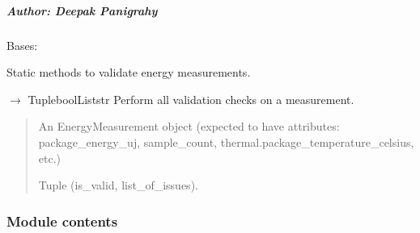 \documentclass[letterpaper,10pt,english]{sphinxmanual}
\begin{document}
\subparagraph{Author: Deepak Panigrahy}
\label{\detokenize{core.utils.validators:author-deepak-panigrahy}}

\begin{fulllineitems}
\label{\detokenize{core.utils.validators:core.utils.validators.MeasurementValidator}}
\pysigstartsignatures
\pysigline
{}
\pysigstopsignatures
\sphinxAtStartPar
Bases: 

\sphinxAtStartPar
Static methods to validate energy measurements.

\begin{fulllineitems}
\label{\detokenize{core.utils.validators:core.utils.validators.MeasurementValidator.validate}}
\pysigstartsignatures
\pysiglinewithargsret
{}
{}
{{ $\rightarrow$ Tuple\DUrole{p}{{[}}boolList\DUrole{p}{{[}}str\DUrole{p}{{]}}\DUrole{p}{{]}}}}
\pysigstopsignatures
\sphinxAtStartPar
Perform all validation checks on a measurement.
\begin{quote}\begin{description}
\sphinxAtStartPar
{} \textendash{} An EnergyMeasurement object (expected to have
attributes: package\_energy\_uj, sample\_count,
thermal.package\_temperature\_celsius, etc.)

\sphinxAtStartPar
Tuple (is\_valid, list\_of\_issues).

\end{description}\end{quote}

\end{fulllineitems}


\end{fulllineitems}



\subsubsection{Module contents}
\label{\detokenize{core.utils:module-core.utils}}\label{\detokenize{core.utils:module-contents}}
\end{document}

